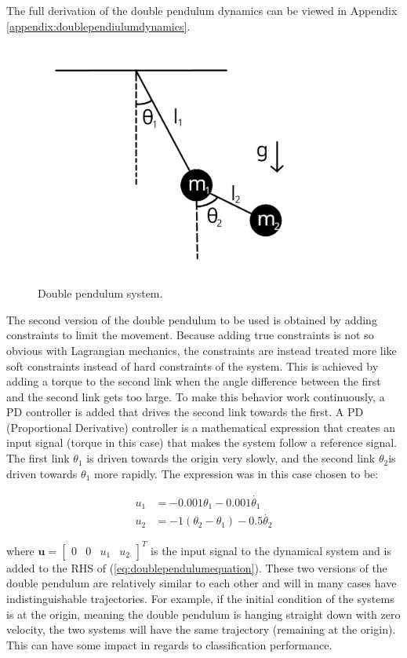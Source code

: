 \documentclass[12pt,a4paper]{book}
\begin{document}
The full derivation of the double pendulum dynamics can be viewed in Appendix \ref{appendix:doublependiulumdynamics}.

\begin{figure}[H]
    \centering
    \includegraphics[height=8cm]{figs/doublependulum.png}
    \caption{Double pendulum system.}
    \label{fig:doublependulum}
\end{figure}

The second version of the double pendulum to be used is obtained by adding constraints to limit the movement. Because adding true constraints is not so obvious with Lagrangian mechanics, the constraints are instead treated more like soft constraints instead of hard constraints of the system. This is achieved by adding a torque to the second link when the angle difference between the first and the second link gets too large. To make this behavior work continuously, a PD controller is added that drives the second link towards the first. A PD (Proportional Derivative) controller is a mathematical expression that creates an input signal (torque in this case) that makes the system follow a reference signal. The first link $\theta_1$ is driven towards the origin very slowly, and the second link $\theta_2 $is driven towards $\theta_1$ more rapidly. The expression was in this case chosen to be:

\begin{equation}
    \begin{aligned}
        u_1 &= -0.001 \theta_1 - 0.001 \dot{\theta_1} \\
        u_2 &= -1 (\theta_2 - \theta_1) - 0.5 \dot{\theta_2}
    \end{aligned}
\end{equation}

\noindent where $\bm{u} = \begin{bmatrix} 0 & 0 & u_1 & u_2 \end{bmatrix}^T$ is the input signal to the dynamical system and is added to the RHS of (\ref{eq:doublependulumequation}). These two versions of the double pendulum are relatively similar to each other and will in many cases have indistinguishable trajectories. For example, if the initial condition of the systems is at the origin, meaning the double pendulum is hanging straight down with zero velocity, the two systems will have the same trajectory (remaining at the origin). This can have some impact in regards to classification performance.
\end{document}
